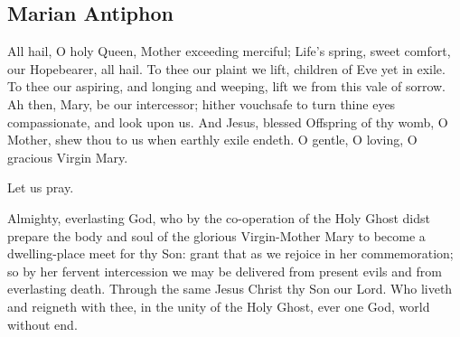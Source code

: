\documentclass{article}
\begin{document}
\begin{responses}
\end{responses}


\begin{responses}
\end{responses}

\subsection*{Marian Antiphon}


All hail, O holy Queen, Mother exceeding merciful; Life's spring, sweet comfort, our Hopebearer, all hail. To thee our plaint we lift, children of Eve yet in exile. To thee our aspiring, and longing and weeping, lift we from this vale of sorrow. Ah then, Mary, be our intercessor; hither vouchsafe to turn thine eyes compassionate, and look upon us. And Jesus, blessed Offspring of thy womb, O Mother, shew thou to us when earthly exile endeth. O gentle, O loving, O gracious Virgin Mary. 

\begin{responses}

    
\end{responses}

Let us pray.

Almighty, everlasting God, who by the co-operation of the Holy Ghost didst prepare the body and soul of the glorious Virgin-Mother Mary to become a dwelling-place meet for thy Son: grant that as we rejoice in her commemoration; so by her fervent intercession we may be delivered from present evils and from everlasting death. Through the same Jesus Christ thy Son our Lord. Who liveth and reigneth with thee, in the unity of the Holy Ghost, ever one God, world without end.
\end{document}
